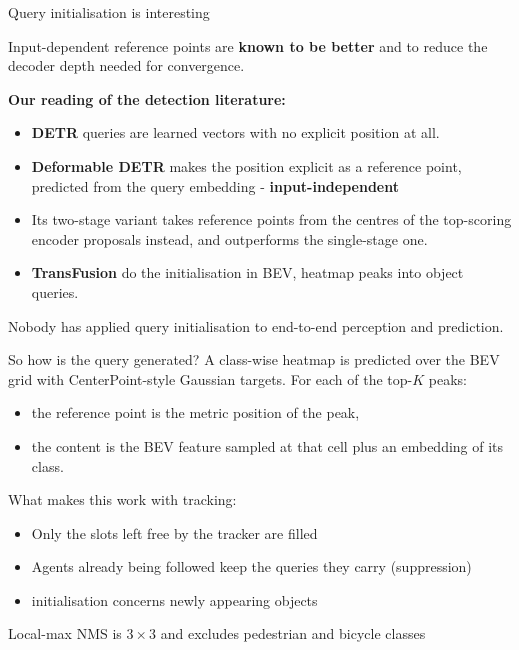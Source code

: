 \documentclass[aspectratio=169,11pt,t]{beamer}
\newcommand{\refcite}[1]{\textcolor{tuered}{\scriptsize\cite{#1}}}
\begin{document}
\begin{frame}{Query initialisation is interesting}
    \begin{block}{}
    Input-dependent reference points are \textbf{known to be better} and to reduce the
    decoder depth needed for convergence. \\
    \end{block}
  \textbf{Our reading of the detection literature:}
  \vspace{0.4em}
  \begin{itemize}
    \item \textbf{DETR}\refcite{Carion2020DETR} queries are learned vectors
      with no explicit position at all.
    \item \textbf{Deformable DETR}\refcite{Zhu2021DeformableDETR} makes the
      position explicit as a reference point, predicted from the query
      embedding - \textbf{input-independent}
    \item Its \alert{two-stage variant} takes reference points from the centres
      of the top-scoring encoder proposals instead, and \alert{outperforms the
      single-stage one}.
    \item \textbf{TransFusion}\refcite{Bai2022TransFusion} do the initialisation in BEV, heatmap peaks into object queries.
  \end{itemize}

  \vspace{0.4em}
  \alert{Nobody has applied query initialisation to end-to-end perception and prediction.}
\end{frame}

\begin{frame}{So how is the query generated?}
  A class-wise heatmap is predicted over the BEV grid with
  CenterPoint-style\refcite{Yin2021CenterPoint} Gaussian targets. For each of
  the top-$K$ peaks:
  \begin{itemize}
    \item the \alert{reference point} is the metric position of the peak,
    \item the \alert{content} is the BEV feature sampled at that cell plus an
      embedding of its class.
  \end{itemize}

  \vspace{0.4em}
  \begin{block}{What makes this work with tracking: }
    \begin{itemize}
    \item Only the slots left free by the tracker are filled
    \item Agents already being followed keep the queries they carry (suppression) 
    \item initialisation concerns \alert{newly appearing objects }
    \end{itemize}
  \end{block}

  \vspace{0.4em}
  \footnotesize
  Local-max NMS is $3{\times}3$ and excludes pedestrian and bicycle classes
\end{frame}
\end{document}
